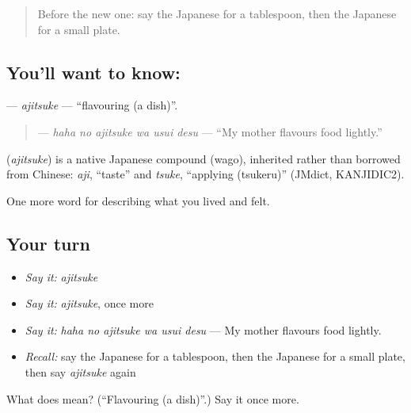 \label{lesson:JA-C475-ajitsuke}



\begin{quote}
Before the new one: say the Japanese for a tablespoon, then the Japanese for a small plate.
\end{quote}

\subsection*{You'll want to know: }
\textbf{} — \emph{ajitsuke} — \textquotedblleft{}flavouring (a dish)\textquotedblright{}.

\begin{quote}
\textbf{  } — \emph{haha no ajitsuke wa usui desu} — \textquotedblleft{}My mother flavours food lightly.\textquotedblright{}
\end{quote}

\begin{cousinweb}
\textbf{} (\emph{ajitsuke}) is a native Japanese compound (wago), inherited rather than borrowed from Chinese: \emph{aji}, \textquotedblleft{}taste\textquotedblright{} and \emph{tsuke}, \textquotedblleft{}applying (tsukeru)\textquotedblright{} (JMdict, KANJIDIC2).
\end{cousinweb}

\begin{grammarlens}[title={What you've built}]
One more word for describing what you lived and felt.
\end{grammarlens}

\subsection*{Your turn}
\begin{itemize}
\raggedright
  \item \emph{Say it:} \emph{ajitsuke}
  \item \emph{Say it:} \emph{ajitsuke}, once more
  \item \emph{Say it:} \emph{haha no ajitsuke wa usui desu} — My mother flavours food lightly.
  \item \emph{Recall:} say the Japanese for a tablespoon, then the Japanese for a small plate, then say \emph{ajitsuke} again
\end{itemize}

\begin{tcolorbox}[breakable,colback=teal!4,colframe=teal!35!black,title={Before you move on}]
What does  mean? (\textquotedblleft{}Flavouring (a dish)\textquotedblright{}.) Say it once more.
\end{tcolorbox}
